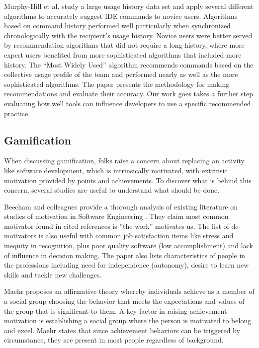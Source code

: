 \documentclass{sig-alternate}
\begin{document}
Murphy-Hill et al. study a large usage history data set and apply several different algorithms to accurately suggest IDE commands to novice users.\cite{MurphyHill2012Improving} Algorithms based on command history performed well particularly when synchronized chronologically with the recipient's usage history. Novice users were better served by recommendation algorithms that did not require a long history, where more expert users benefited from more sophisticated algorithms that included more history. The ``Most Widely Used'' algorithm recommends commands based on the collective usage profile of the team and performed nearly as well as the more sophisticated algorithms. The paper presents the methodology for making recommendations and evaluate their accuracy. Our work goes takes a further step evaluating how well tools can influence developers to use a specific recommended practice.

\subsection{Gamification}

When discussing gamification, folks raise a concern about replacing an activity like software development, which is intrinsically motivated, with extrinsic motivation provided by points and achievements.  To discover what is behind this concern, several studies are useful to understand what should be done. 

Beecham and colleagues provide a thorough analysis of existing literature on studies of motivation in Software Engineering \cite{Beecham2008Motivation}.  They claim most common motivator found in cited references is ''the work'' motivates us. The list of de-motivators is also useful with common job satisfaction items like stress and inequity in recognition, plus poor quality software (low accomplishment) and lack of influence in decision making. The paper also lists characteristics of people in the professions including need for independence (autonomy), desire to learn new skills and tackle new challenges. 

Maehr proposes an affirmative theory whereby  individuals achieve as a member of a social group choosing the behavior that meets the expectations and values of the group that is significant to them\cite{wbsnipes:MaehrCulture}.  A key factor in raising achievement motivation is establishing a social group where the person is motivated to belong and excel.  Maehr states that since achievement behaviors can be triggered by circumstance, they are present in most people regardless of background. 
\end{document}
